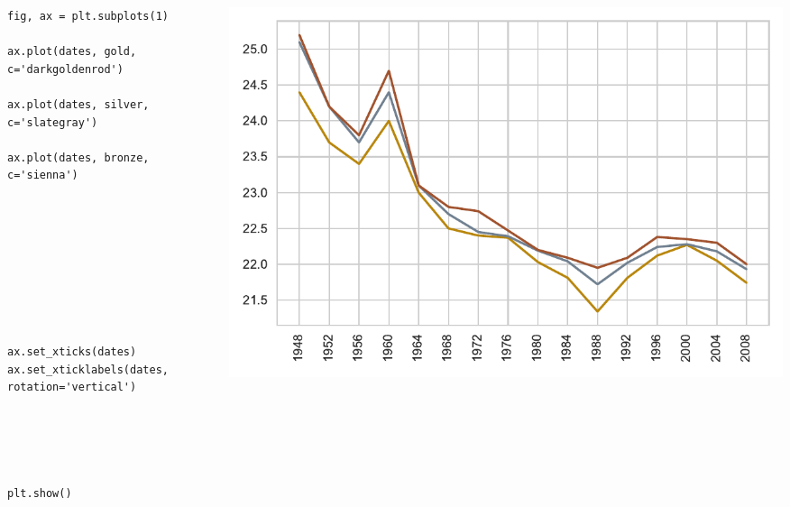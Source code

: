 \documentclass{beamer}
\begin{document}
\begin{frame}[fragile]
\tiny{
\begin{columns}
\begin{column}{0.45\textwidth}
\begin{verbatim}
fig, ax = plt.subplots(1)

ax.plot(dates, gold, c='darkgoldenrod')

ax.plot(dates, silver, c='slategray')

ax.plot(dates, bronze, c='sienna')









ax.set_xticks(dates)
ax.set_xticklabels(dates, rotation='vertical')





plt.show()
\end{verbatim}
\end{column}
\begin{column}{0.55\textwidth}
\includegraphics[width=\textwidth]{olympics_3.pdf}
\end{column}
\end{columns}
}
\end{frame}
\end{document}
